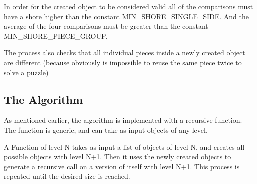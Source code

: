 \documentclass{article}
\begin{document}
In order for the created object to be considered valid all of the comparisons must have a shore higher
than the constant MIN\_SHORE\_SINGLE\_SIDE. And the average of the four comparisons must be greater
than the constant MIN\_SHORE\_PIECE\_GROUP.

The process also checks that all individual pieces inside a newly
created object are different (because obviously is impossible to reuse the same piece twice to solve a puzzle)
\subsection{The Algorithm}

As mentioned earlier, the algorithm is implemented with a recursive function.
The function is generic, and can take as input objects of any level.

A Function of level N takes as input a list of objects of level N,
and creates all possible objects with level N+1.
Then it uses the newly created objects to generate a recursive call on a version
of itself with level N+1.
This process is repeated until the desired size is reached.
\end{document}
